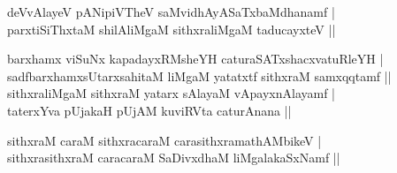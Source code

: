 \begin{entry}
\smallskip
\begin{shl}
deVvAlayeV pANipiVTheV saMvidhAyASaTxbaMdhanamf |\\[1pt]
parxtiSiThxtaM shilAliMgaM sithxraliMgaM taducayxteV ||
\end{shl}
\smallskip
{}
\smallskip
\begin{shl}
barxhamx viSuNx kapadayxRMsheYH caturaSATxshacxvatuRleYH |\\[1pt]
sadfbarxhamxsUtarxsahitaM liMgaM yatatxtf sithxraM samxqqtamf ||\\[1pt]
sithxraliMgaM sithxraM yatarx sAlayaM vApayxnAlayamf |\\[1pt]
taterxYva pUjakaH pUjAM kuviRVta caturAnana ||
\end{shl}
\smallskip
{}
\smallskip
{}
\smallskip
{}
\end{entry}

\begin{entry}
\smallskip
\begin{shl}
sithxraM caraM sithxracaraM carasithxramathAMbikeV |\\[1pt]
sithxrasithxraM caracaraM SaDivxdhaM liMgalakaSxNamf ||
\end{shl}
\smallskip
{}
\end{entry}


